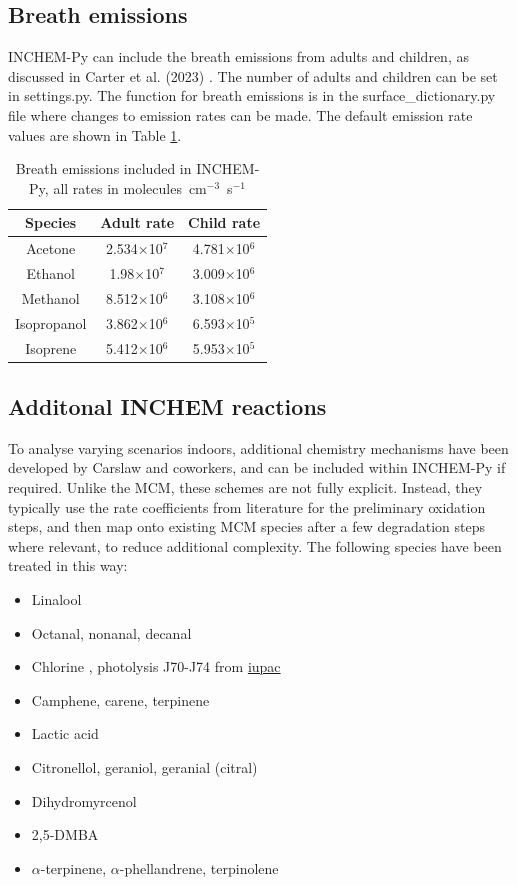 \documentclass[a4paper]{refart}
\begin{document}
\subsection{Breath emissions}\label{breath_emissions}
INCHEM-Py can include the breath emissions from adults and children, as discussed in Carter et al. (2023) \cite{Carter2023}. The number of adults and children can be set in settings.py. The function for breath emissions is in the surface\_dictionary.py file where changes to emission rates can be made.
The default emission rate values are shown in Table \ref{tab:breath_emissions}.

\begin{table}[]
    \centering
    \begin{tabular}{c c c}
        Species & Adult rate & Child rate \\
        \hline
        Acetone & 2.534$\times$10$^7$ & 4.781$\times$10$^6$ \\
        Ethanol & 1.98$\times$10$^7$ & 3.009$\times$10$^6$\\
        Methanol & 8.512$\times$10$^6$ & 3.108$\times$10$^6$\\
        Isopropanol & 3.862$\times$10$^6$ & 6.593$\times$10$^5$\\
        Isoprene & 5.412$\times$10$^6$ & 5.953$\times$10$^5$
    \end{tabular}
    \caption{Breath emissions included in INCHEM-Py, all rates in molecules~cm$^{-3}$~s$^{-1}$ \cite{Carter2023}}
    \label{tab:breath_emissions}
\end{table}

\subsection{Additonal INCHEM reactions}\label{inchem_chemistry}
To analyse varying scenarios indoors, additional chemistry mechanisms have been developed by Carslaw and coworkers, and can be included within INCHEM-Py if required. Unlike the MCM, these schemes are not fully explicit. Instead, they typically use the rate coefficients from literature for the preliminary oxidation steps, and then map onto existing MCM species after a few degradation steps where relevant, to reduce additional complexity. The following species have been treated in this way:
\begin{itemize}
    \item Linalool \cite{Carslaw2017}
    \item Octanal, nonanal, decanal \cite{Kruza2017}
    \item Chlorine \cite{Xue2015,Wong2017,Wang2020}, photolysis J70-J74 from \href{http://iupac.pole-ether.fr}{iupac}
    \item Camphene, carene, terpinene \cite{Carslaw2007}
    \item Lactic acid
    \item Citronellol, geraniol, geranial (citral)
    \item Dihydromyrcenol
    \item 2,5-DMBA
    \item $\alpha$-terpinene, $\alpha$-phellandrene, terpinolene
\end{itemize}
\end{document}
